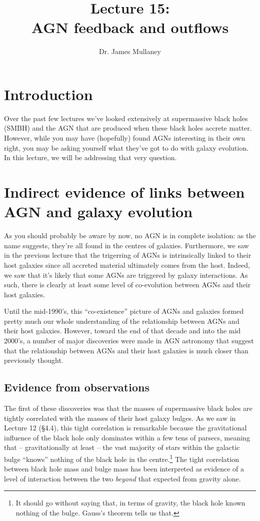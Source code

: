 \documentclass[11pt]{article}
\begin{document}
 
\title{Lecture 15: \\ AGN feedback and outflows}
\author{Dr. James Mullaney}
\maketitle

\section{Introduction}
Over the past few lectures we've looked extensively at supermassive
black holes (SMBH) and the AGN that are produced when these black holes
accrete matter. However, while you may have (hopefully) found AGNs
interesting in their own right, you may be asking yourself what
they've got to do with galaxy evolution. In this lecture, we will be
addressing that very question.

\section{Indirect evidence of links between AGN and galaxy evolution}
As you should probably be aware by now, no AGN is in complete
isolation: as the name suggests, they're all found in the centres of
galaxies. Furthermore, we saw in the previous lecture that the
trigerring of AGNs is intrinsically linked to their host galaxies
since all accreted material ultimately comes from the host. Indeed, we
saw that it's likely that some AGNs are triggered by galaxy
interactions. As such, there is clearly at least some level of
co-evolution between AGNs and their host galaxies.

Until the mid-1990's, this ``co-existence'' picture of AGNs and
galaxies formed pretty much our whole understanding of the
relationship between AGNs and their host galaxies. However, toward the
end of that decade and into the mid 2000's, a number of major discoveries
were made in AGN astronomy that suggest that the relationship between
AGNs and their host galaxies is much closer than previously
thought.

\subsection{Evidence from observations}
The first of these discoveries was that the masses of supermassive
black holes are tightly correlated with the masses of their host
galaxy bulges. As we saw in Lecture 12 (\S 4.4), this tight
correlation is remarkable because the gravitational influence of the
black hole only dominates within a few tens of parsecs, meaning that
-- gravitationally at least -- the vast majority of stars within the
galactic bulge ``knows'' nothing of the black hole in the
centre.\footnote{It should go without saying that, in terms of
  gravity, the black hole known nothing of the bulge. Gauss's theorem
  tells us that.} The tight correlation between black hole mass
and bulge mass has been interpreted as evidence of a level of
interaction between the two {\it beyond} that expected from gravity
alone.
\end{document}
